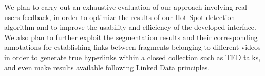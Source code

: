 \documentclass{llncs}
\begin{document}
We plan to carry out an exhaustive evaluation of our approach involving real users feedback, in order to optimize the results of our Hot Spot detection algorithm and to improve the usability and efficiency of the developed interface. We also plan to further exploit the segmentation results and their corresponding annotations for establishing links between fragments belonging to different videos in order to generate true hyperlinks within a closed collection such as TED talks, and even make results available following Linked Data principles.





\end{document}
